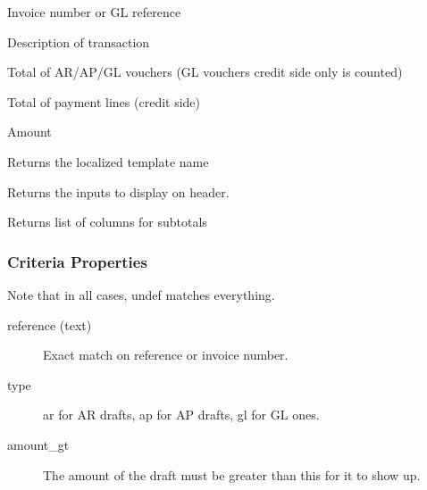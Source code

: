 \begin{description}
\begin{description}
\begin{description}
\begin{description}
\begin{description}
\begin{description}
\begin{description}
\begin{description}
\begin{description}
\begin{description}
\begin{description}
\begin{description}
Invoice number or GL reference


\item[{description}] \mbox{}

Description of transaction


\item[{transaction\_total}] \mbox{}

Total of AR/AP/GL vouchers (GL vouchers credit side only is counted)


\item[{payment\_total}] \mbox{}

Total of payment lines (credit side)



Amount

\end{description}

\item[{name}] \mbox{}

Returns the localized template name


\item[{header\_lines}] \mbox{}

Returns the inputs to display on header.


\item[{subtotal\_cols}] \mbox{}

Returns list of columns for subtotals

\end{description}
\subsubsection*{Criteria Properties\label{LedgerSMB::DBObject::Report::Unapproved::Batch_Overview_Criteria_Properties}}


Note that in all cases, undef matches everything.

\begin{description}

\item[{reference (text)}] \mbox{}

Exact match on reference or invoice number.


\item[{type}] \mbox{}

ar for AR drafts, ap for AP drafts, gl for GL ones.


\item[{amount\_gt}] \mbox{}

The amount of the draft must be greater than this for it to show up.



\end{description}
\end{description}
\end{description}
\end{description}
\end{description}
\end{description}
\end{description}
\end{description}
\end{description}
\end{description}
\end{description}
